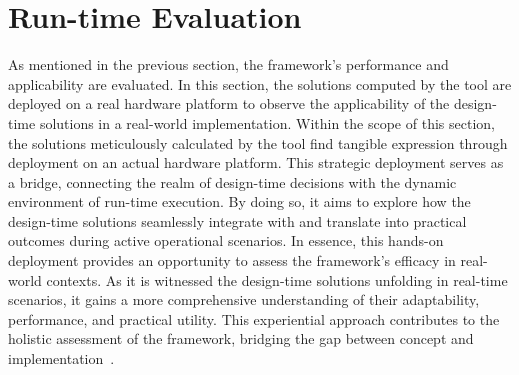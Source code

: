     \section{Run-time Evaluation}\label{runTime}
    
    As mentioned in the previous section, the framework's performance and applicability are evaluated. In this section, the solutions computed by the tool are deployed on a real hardware platform to observe the applicability of the design-time solutions in a real-world implementation.
    Within the scope of this section, the solutions meticulously calculated by the tool find tangible expression through deployment on an actual hardware platform. This strategic deployment serves as a bridge, connecting the realm of design-time decisions with the dynamic environment of run-time execution. By doing so, it aims to explore how the design-time solutions seamlessly integrate with and translate into practical outcomes during active operational scenarios.
    In essence, this hands-on deployment provides an opportunity to assess the framework's efficacy in real-world contexts. As it is witnessed the design-time solutions unfolding in real-time scenarios, it gains a more comprehensive understanding of their adaptability, performance, and practical utility. This experiential approach contributes to the holistic assessment of the framework, bridging the gap between concept and implementation~\cite{askaripoor2023designer, 9613692}. 
    
